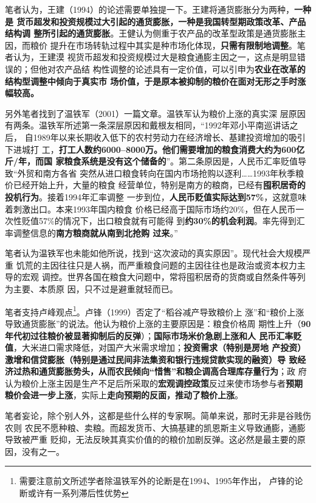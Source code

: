 笔者认为，王建（1994）的论述需要单独提一下。王建将通货膨胀分为两种，\textbf{一种是
  货币超发和投资规模过大引起的通货膨胀，一种是我国转型期政策改革、产品结构调
  整所引起的通货膨胀}。王健认为侧重于农产品的改革型政策是通货膨胀主因，而粮价
提升在市场转轨过程中其实是种市场化体现，\textbf{只需有限制地调整}。笔者认为，王建漠
视货币超发和投资规模过大是粮食通膨主因之一，这点是明显错误的；但他对农产品结
构性调整的论述具有一定价值，可以引申为\textbf{农业在改革的结构型调整中倾向于真实市
  场价值，于是原本被抑制的粮价在面对无形之手时涨幅较高。}

另外笔者找到了温铁军（2001）一篇文章\cite{6cibodong}。温铁军认为粮价上涨的真实深
层原因有两条。温铁军所述第一条深层原因和戴根友相同，“1992年邓小平南巡讲话之后，
自1989年以来长期收入低下的农村劳动力在经济增长、基建投资增加的吸引下进城打
工，\textbf{打工人数约6000--8000万。他们需要增加的粮食消费大约为600亿斤/年，而国
  家粮食系统是没有这个储备的}”。第二条原因是，人民币汇率贬值导致“外贸和南方各省
突然从进口粮食转向在国内市场抢购以逐利……1993年秋季粮价已经开始上升，大量的粮食
经营单位，特别是南方的粮商，已经有\textbf{囤积居奇的投机行为}。接着1994年汇率调整
一步到位，\textbf{人民币贬值实际达到57\%}，这就意味着刺激出口。本来1993年国内粮食
价格已经高于国际市场约20\%，但在人民币一次性贬值57\%的情况下，出口粮食就有可能得
到\textbf{约30\%的机会利润}。率先得到汇率调整信息的\textbf{南方粮商就从南到北抢购
  过来}。”

笔者认为温铁军也未能如他所说，找到“这次波动的真实原因”。现代社会大规模严重
饥荒的主因往往只是人祸，而严重粮食问题的主因往往也是政治或资本权力主导的宏观
调控。世界各国在粮食大问题中，常将囤积居奇的货商或自然条件等列为主要、本质原
因，只不过是避重就轻而已。

笔者支持卢峰观点\footnote{需要注意前文所述学者除温铁军外的论断是在1994、1995年作出，
  卢锋的论断或许有一系列滞后性优势}。卢锋（1999）否定了“稻谷减产导致粮价上
涨”和“粮价上涨导致通货膨胀”的说法。他认为粮价上涨的主要原因是：粮食价格周
期性上升（\textbf{90年代初过往粮价被显著抑制后的反弹}）；\textbf{国际市场米价急剧上涨和人
  民币汇率贬值}，大米进口需求降低，对国产大米需求增加；\textbf{投资需求（特别是房地
  产投资）激增和信贷膨胀（特别是通过民间非法集资和银行违规贷款实现的融资）导
  致经济过热和通货膨胀势头，从而农民倾向“惜售”和粮企调高合理库存量行为}；政
府认为粮价上涨主因是生产不足后所采取的\textbf{宏观调控政策}反过来使市场参与者\textbf{预期
  粮价会进一步上涨}，实际上\textbf{走向预期的反面，推动了粮价上涨}。

笔者妄论，除个别人外，这都是些什么样的专家啊。简单来说，那时无非是谷贱伤农则
农民不愿种粮、卖粮。而超发货币、大搞基建的凯恩斯主义导致通膨，通膨导致被严重
贬抑，无法反映其真实价值的的粮价加剧反弹。这必然是最主要的原因，没有之一。

